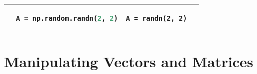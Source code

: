 \begin{tabular}[]{@{}llll@{}}
\begin{minipage}[t]{0.20\columnwidth}
\end{minipage} & \begin{minipage}[t]{0.25\columnwidth}\raggedright
\begin{lstlisting}[language=Python]
A = np.random.randn(2, 2)
\end{lstlisting}

\end{minipage} & \begin{minipage}[t]{0.20\columnwidth}\raggedright
\begin{lstlisting}
A = randn(2, 2)
\end{lstlisting}

\end{minipage}\tabularnewline
\bottomrule
\end{tabular}

\section{Manipulating Vectors and
Matrices}\label{manipulating-vectors-and-matrices}

